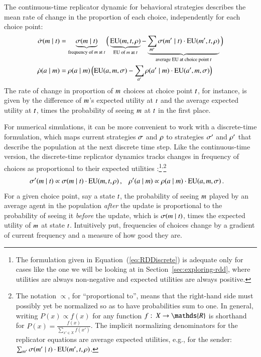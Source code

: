 \documentclass[fleqn,reqno,10pt]{article}
\begin{document}
The continuous-time replicator dynamic for behavioral strategies describes the mean rate of
change in the proportion of each choice, independently for each choice point:
\begin{align}
  \label{eq:RDContinuous}
  \dot{\sigma}(m \mid t) & = \underbrace{\sigma(m \mid
    t)}_{\text{frequency of $m$ at $t$}}  \Big ( \underbrace{\mathrm{EU}(m,
  t, \rho)}_{\text{EU of $m$ at $t$}} -   \underbrace{\sum_{m'}
      \sigma(m' \mid t) \cdot \mathrm{EU}(m',t,\rho)}_{\text{average
      EU at choice point $t$}} \Big ) \\
  \dot{\rho}(a \mid m) & = \rho(a \mid m) \thinspace \Big ( \mathrm{EU}(a,
  m, \sigma) -  \sum_{a'} \rho(a' \mid m) \cdot \mathrm{EU}(a',
  m,\sigma)  \Big ) \nonumber
\end{align}
The rate of change in proportion of $m$ choices at choice point $t$, for instance, is
given by the difference of $m$'s expected utility at $t$ and the average expected
utility at $t$, times the probability of seeing $m$ at $t$ in the first place.

For numerical simulations, it can be more convenient to work with a discrete-time formulation,
which maps current strategies $\sigma$ and $\rho$ to strategies $\sigma'$ and $\rho'$
that describe the population at the next discrete time step. Like the continuous-time version,
the discrete-time replicator dynamics tracks changes in frequency of choices as proportional to
their expected utilities \citep[e.g.][]{HofbauerSigmund1998:Evolutionary-Ga}:\footnote{The
  formulation given in Equation~(\ref{eq:RDDiscrete}) is adequate only for cases like the one
  we will be looking at in Section~\ref{sec:exploring-rdd}, where utilities are always
  non-negative and expected utilities are always positive.}\textsuperscript{,}\footnote{The
  notation $\propto$, for ``proportional to'', means that the right-hand side must possibly yet
  be normalized so as to have probabilities sum to one. In general, writing $P(x) \propto f(x)$
  for any function $f \mycolon X \rightarrow \mathds{R}$ is shorthand for
  $P(x) = \frac{f(x)}{\sum_{x' \in X} f(x')}$. The implicit normalizing denominators for the
  replicator equations are average expected utilities, e.g., for the sender:
  $\sum_{m'} \sigma(m' \mid t) \cdot \mathrm{EU}(m', t,\rho)$.}
\begin{align}
  \label{eq:RDDiscrete}
  \sigma'(m \mid t) & \propto \sigma(m \mid t) \cdot
    \mathrm{EU}(m, t,\rho)\,, & \rho'(a \mid m) & \propto \rho(a \mid m) \cdot
    \mathrm{EU}(a, m,\sigma)\,.   
\end{align}
For a given choice point, say a state $t$, the probability of seeing $m$ played by an
average agent in the population \emph{after} the update is proportional to the probability of
seeing it \emph{before} the update, which is $\sigma(m \mid t)$, times the
expected utility of $m$ at state $t$. Intuitively put, frequencies of choices change
by a gradient of current frequency and a measure of how good they are.
\end{document}
